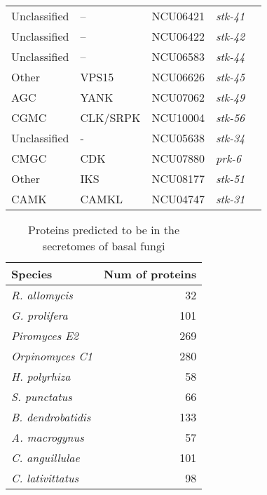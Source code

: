 \begin{table}[htbp]
\begin{tabular}{lllll}
  Unclassified & -- & NCU06421 & \emph{stk-41} \\ 
  Unclassified & -- & NCU06422 & \emph{stk-42} \\ 
  Unclassified & -- & NCU06583 & \emph{stk-44} \\ 
  Other & VPS15 & NCU06626 & \emph{stk-45} \\ 
  AGC & YANK & NCU07062 & \emph{stk-49} \\ 
  CGMC & CLK/SRPK & NCU10004 & \emph{stk-56} \\ 
  Unclassified & - & NCU05638 & \emph{stk-34} \\ 
  CMGC & CDK & NCU07880 & \emph{prk-6} \\ 
  Other & IKS & NCU08177 & \emph{stk-51} \\ 
  CAMK & CAMKL & NCU04747 & \emph{stk-31} \\ 
   \hline
\end{tabular}
\end{table}
\begin{table}[htbp]
\centering
\caption[Chytrid secretome predictions]{Proteins predicted to be in the secretomes of basal fungi} 
\label{tab:ChInhib_ChySec}
\begin{tabular}{lr}
  \hline
Species & Num of proteins \\ 
  \hline
\emph{R. allomycis} &  32 \\ 
  \emph{G. prolifera} & 101 \\ 
  \emph{Piromyces E2} & 269 \\ 
  \emph{Orpinomyces C1} & 280 \\ 
  \emph{H. polyrhiza} &  58 \\ 
  \emph{S. punctatus} &  66 \\ 
  \emph{B. dendrobatidis} & 133 \\ 
  \emph{A. macrogynus} &  57 \\ 
  \emph{C. anguillulae} & 101 \\ 
  \emph{C. lativittatus} &  98 \\ 
   \hline
\end{tabular}
\end{table}
